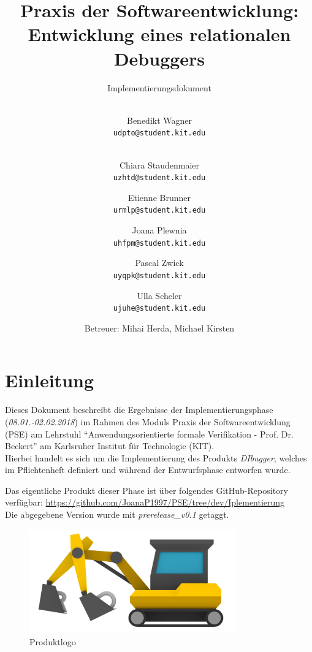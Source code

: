 \documentclass[parskip=full]{scrartcl}
\title{
	\vspace{2cm}
	\myfont 
	Praxis der Softwareentwicklung:\\ 
	Entwicklung eines relationalen Debuggers\\
}
\subtitle{
	\vspace{1cm}
	\myfont
	Implementierungsdokument
}
\author{
	\vspace{1cm} \\
	Benedikt Wagner\\
	\texttt{udpto@student.kit.edu}
	\and \vspace{1cm} \\ Chiara Staudenmaier\\
	\texttt{uzhtd@student.kit.edu}
	\and Etienne Brunner\\
	\texttt{urmlp@student.kit.edu}
	\and Joana Plewnia\\
	\texttt{uhfpm@student.kit.edu} 
	\and Pascal Zwick\\
	\texttt{uyqpk@student.kit.edu}
	\and Ulla Scheler\\
	\texttt{ujuhe@student.kit.edu}
	\vspace{1cm}
	\and Betreuer: Mihai Herda, Michael Kirsten
	\vspace{4cm}
}
\begin{document}
\clearpage
\maketitle
{}
\newpage

\tableofcontents
\newpage
{}

\section{Einleitung}
Dieses Dokument beschreibt die Ergebnisse der Implementierungsphase (\textit{08.01.-02.02.2018}) im Rahmen des Moduls Praxis der Softwareentwicklung (PSE) am Lehrstuhl \enquote{Anwendungsorientierte formale Verifikation - Prof. Dr. Beckert} am Karlsruher Institut für Technologie (KIT).\\
Hierbei handelt es sich um die Implementierung des Produkts \textit{DIbugger}, welches im Pflichtenheft definiert und während der Entwurfsphase entworfen wurde.

Das eigentliche Produkt dieser Phase ist über folgendes GitHub-Repository verfügbar: \href{https://github.com/JoanaP1997/PSE/tree/dev/Iplementierung}{https://github.com/JoanaP1997/PSE/tree/dev/Iplementierung} \\
Die abgegebene Version wurde mit \textit{prerelease\_v0.1} getaggt.

\begin{figure}[!h]
\centering
\includegraphics[width=0.8\textwidth]{../Plichtenheft/logo_nongi.png}
\caption{Produktlogo}
\end{figure}
\end{document}
